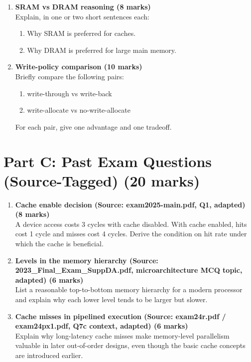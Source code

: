 \documentclass[11pt]{article}
\begin{document}
\begin{enumerate}[label=\textbf{B\arabic*.}]
  \item \textbf{SRAM vs DRAM reasoning (8 marks)}\\
  Explain, in one or two short sentences each:
  \begin{enumerate}[label=(\alph*)]
    \item Why SRAM is preferred for caches.
    \item Why DRAM is preferred for large main memory.
  \end{enumerate}

  \item \textbf{Write-policy comparison (10 marks)}\\
  Briefly compare the following pairs:
  \begin{enumerate}[label=(\alph*)]
    \item write-through vs write-back
    \item write-allocate vs no-write-allocate
  \end{enumerate}
  For each pair, give one advantage and one tradeoff.
\end{enumerate}

\section*{Part C: Past Exam Questions (Source-Tagged) (20 marks)}
\begin{enumerate}[label=\textbf{C\arabic*.}]
  \item \textbf{Cache enable decision (Source: exam2025-main.pdf, Q1, adapted) (8 marks)}\\
  A device access costs 3 cycles with cache disabled. With cache enabled, hits cost 1 cycle and misses cost 4 cycles. Derive the condition on hit rate under which the cache is beneficial.

  \item \textbf{Levels in the memory hierarchy (Source: 2023\_Final\_Exam\_SuppDA.pdf, microarchitecture MCQ topic, adapted) (6 marks)}\\
  List a reasonable top-to-bottom memory hierarchy for a modern processor and explain why each lower level tends to be larger but slower.

  \item \textbf{Cache misses in pipelined execution (Source: exam24r.pdf / exam24px1.pdf, Q7c context, adapted) (6 marks)}\\
  Explain why long-latency cache misses make memory-level parallelism valuable in later out-of-order designs, even though the basic cache concepts are introduced earlier.
\end{enumerate}
\end{document}
